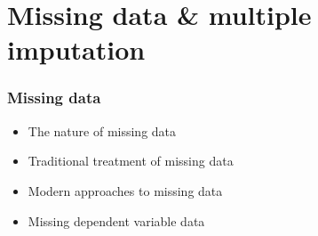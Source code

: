 \documentclass{beamer}
\begin{document}

\section{Missing data \& multiple imputation}

\begin{frame}
\frametitle{Missing data}


\begin{itemize}
  \item The nature of missing data
  \item Traditional treatment of missing data
  \item Modern approaches to missing data
  \item Missing dependent variable data

\end{itemize}


\end{frame}

\end{document}
